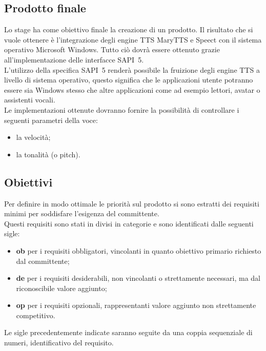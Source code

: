 \subsection{Prodotto finale}
Lo stage ha come obiettivo finale la creazione di un prodotto.
Il risultato che si vuole ottenere è l'integrazione degli engine TTS MaryTTS e Speect con il sistema operativo Microsoft Windows. Tutto ciò dovrà essere ottenuto grazie all'implementazione delle interfacce SAPI~5.\\
L'utilizzo della specifica SAPI~5 renderà possibile la fruizione degli engine TTS a livello di sistema operativo, questo significa che le applicazioni utente potranno essere sia Windows stesso che altre applicazioni come ad esempio lettori, avatar o assistenti vocali.\\
Le implementazioni ottenute dovranno fornire la possibilità di controllare i seguenti parametri della voce:
\begin{itemize}
	\item la velocità;
	\item la tonalità (o pitch).
\end{itemize}


\subsection{Obiettivi}

Per definire in modo ottimale le priorità sul prodotto si sono estratti dei requisiti minimi per soddisfare l'esigenza del committente.\\
Questi requisiti sono stati in divisi in categorie e sono identificati dalle seguenti sigle:
\begin{itemize}
	\item \textbf{ob} per i requisiti obbligatori, vincolanti in quanto obiettivo primario
	richiesto dal committente;
	\item  \textbf{de} per i requisiti desiderabili, non vincolanti o strettamente necessari,
	ma dal riconoscibile valore aggiunto;
	\item \textbf{op} per i requisiti opzionali, rappresentanti valore aggiunto non
	strettamente competitivo.
\end{itemize}
Le sigle precedentemente indicate saranno seguite da una coppia sequenziale di numeri, identificativo del requisito.\\

